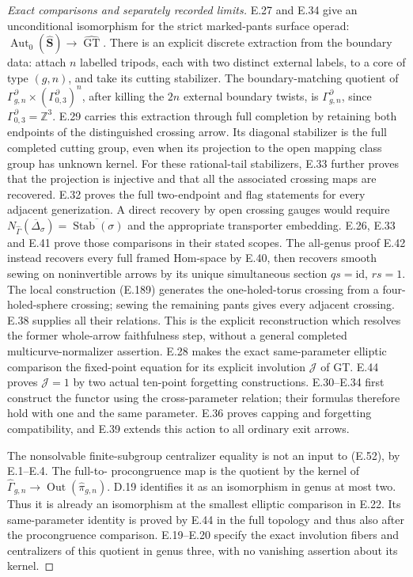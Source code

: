\begin{proof}[Exact comparisons and separately recorded limits]
E.27 and E.34 give an unconditional isomorphism
for the strict marked-pants surface operad:
$\operatorname{Aut}_0(\widehat{\mathbf S})\to
\widehat{\operatorname{GT}}$.
There is an explicit discrete extraction from the
boundary data: attach $n$ labelled tripods, each
with two distinct external labels, to a core of
type $(g,n)$, and take its cutting stabilizer.
The boundary-matching quotient of
$\Gamma_{g,n}^{\partial}\times
(\Gamma_{0,3}^{\partial})^n$, after killing the
$2n$ external boundary twists, is
$\Gamma_{g,n}^{\partial}$, since
$\Gamma_{0,3}^{\partial}=\mathbb Z^3$.
E.29 carries this extraction through full completion
by retaining both endpoints of the distinguished
crossing arrow.  Its diagonal stabilizer is the
full completed cutting group, even when its
projection to the open mapping class group has
unknown kernel. For these rational-tail stabilizers,
E.33 further proves that the projection is injective
and that all the associated crossing maps are
recovered. E.32 proves the full two-endpoint and
flag statements for every adjacent generization.
A direct recovery by open crossing gauges would require
$N_{\widehat\Gamma}(\overline\Delta_\sigma)=
\overline{\operatorname{Stab}(\sigma)}$ and the appropriate
transporter embedding. E.26, E.33 and E.41 prove those
comparisons in their stated scopes. The all-genus proof
E.42 instead recovers every full framed Hom-space by E.40,
then recovers smooth sewing on noninvertible arrows by its
unique simultaneous section $qs=\mathrm{id}$, $rs=1$.
The local construction (E.189) generates the one-holed-torus
crossing from a four-holed-sphere crossing; sewing the
remaining pants gives every adjacent crossing. E.38 supplies
all their relations. This is the explicit reconstruction
which resolves the former whole-arrow faithfulness step,
without a general completed multicurve-normalizer assertion.
E.28 makes the exact same-parameter elliptic
comparison the fixed-point equation for its
explicit involution $\mathcal J$ of GT.
E.44 proves $\mathcal J=1$ by two actual
ten-point forgetting constructions. E.30--E.34
first construct the functor using the cross-parameter
relation; their formulas therefore hold with
one and the same parameter. E.36 proves capping
and forgetting compatibility, and E.39 extends
this action to all ordinary exit arrows.

The nonsolvable finite-subgroup centralizer equality
is not an input to (E.52), by E.1--E.4.  The full-to-
procongruence map is the quotient by the kernel of
$\widehat\Gamma_{g,n}\to\operatorname{Out}
(\widehat\pi_{g,n})$.  D.19 identifies it as an
isomorphism in genus at most two.  Thus it is already
an isomorphism at the smallest elliptic comparison in
E.22. Its same-parameter identity is proved by E.44
in the full topology and thus also after the
procongruence comparison.  E.19--E.20 specify the exact involution
fibers and centralizers of this quotient in genus
three, with no vanishing assertion about its kernel.


\end{proof}
